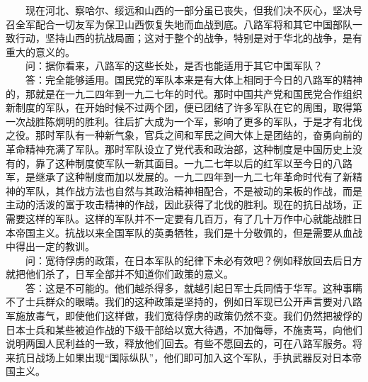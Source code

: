 \documentclass[cn,11pt,chinese]{elegantbook}
\begin{document}
　　现在河北、察哈尔、绥远和山西的一部分虽已丧失，但我们决不灰心，坚决号召全军配合一切友军为保卫山西恢复失地而血战到底。八路军将和其它中国部队一致行动，坚持山西的抗战局面；这对于整个的战争，特别是对于华北的战争，是有重大的意义的。\\
　　问：据你看来，八路军的这些长处，是否也能适用于其它中国军队？\\
　　答：完全能够适用。国民党的军队本来是有大体上相同于今日的八路军的精神的，那就是在一九二四年到一九二七年的时代。那时中国共产党和国民党合作组织新制度的军队，在开始时候不过两个团，便已团结了许多军队在它的周围，取得第一次战胜陈炯明的胜利。往后扩大成为一个军，影响了更多的军队，于是才有北伐之役。那时军队有一种新气象，官兵之间和军民之间大体上是团结的，奋勇向前的革命精神充满了军队。那时军队设立了党代表和政治部，这种制度是中国历史上没有的，靠了这种制度使军队一新其面目。一九二七年以后的红军以至今日的八路军，是继承了这种制度而加以发展的。一九二四年到一九二七年革命时代有了新精神的军队，其作战方法也自然与其政治精神相配合，不是被动的呆板的作战，而是主动的活泼的富于攻击精神的作战，因此获得了北伐的胜利。现在的抗日战场，正需要这样的军队。这样的军队并不一定要有几百万，有了几十万作中心就能战胜日本帝国主义。抗战以来全国军队的英勇牺牲，我们是十分敬佩的，但是需要从血战中得出一定的教训。\\
　　问：宽待俘虏的政策，在日本军队的纪律下未必有效吧？例如释放回去后日方就把他们杀了，日军全部并不知道你们政策的意义。\\
　　答：这是不可能的。他们越杀得多，就越引起日军士兵同情于华军。这种事瞒不了士兵群众的眼睛。我们的这种政策是坚持的，例如日军现已公开声言要对八路军施放毒气，即使他们这样做，我们宽待俘虏的政策仍然不变。我们仍然把被俘的日本士兵和某些被迫作战的下级干部给以宽大待遇，不加侮辱，不施责骂，向他们说明两国人民利益的一致，释放他们回去。有些不愿回去的，可在八路军服务。将来抗日战场上如果出现“国际纵队”，他们即可加入这个军队，手执武器反对日本帝国主义。\\
\end{document}
